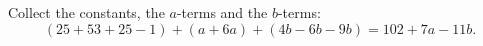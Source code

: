 Collect the constants, the $a$-terms and the $b$-terms:
\[(25+53+25-1)+(a+6a)+(4b-6b-9b)=\boxed{102+7a-11b}.\]
